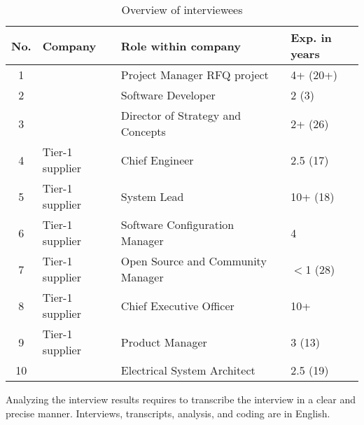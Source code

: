  \begin{table}[htb]
 \centering \small
 \begin{tabular}{|c|l|p{3cm}|l|}\hline
 {\bf No.} & {\bf Company} & {\bf Role within company} & {\bf Exp. in years}\\ \hline
 1 & \company{} & Project Manager RFQ project & 4+ (20+) \\ \hline
 2 & \company{} & Software Developer & 2 (3)\\ \hline
 3 & \company{} & Director of Strategy and Concepts & 2+ (26) \\ \hline
 4 & Tier-1 supplier & Chief Engineer & 2.5 (17)\\ \hline
 5 & Tier-1 supplier & System Lead & 10+ (18) \\ \hline
 6 & Tier-1 supplier & Software Configuration Manager & 4\\ \hline
 7 & Tier-1 supplier & Open Source and Community Manager & $<$1 (28)\\ \hline
 8 & Tier-1 supplier & Chief Executive Officer & 10+\\ \hline
 9 & Tier-1 supplier & Product Manager & 3 (13)\\ \hline
 10 & \company{} & Electrical System Architect & 2.5 (19)\\ \hline
 \end{tabular}
 \caption{Overview of interviewees}
 \label{tab:population}
 \vspace{-.4cm}
 \end{table}


 Analyzing the interview results requires to transcribe the interview in a clear and precise manner. %
{%
Interviews, transcripts, analysis, and coding are in English.} %

